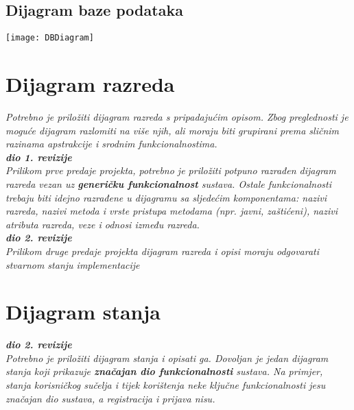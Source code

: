 			
			\subsection{Dijagram baze podataka}
				\texttt{[image: DBDiagram]}
			
			\eject
			
			
		\section{Dijagram razreda}
		
			\textit{Potrebno je priložiti dijagram razreda s pripadajućim opisom. Zbog preglednosti je moguće dijagram razlomiti na više njih, ali moraju biti grupirani prema sličnim razinama apstrakcije i srodnim funkcionalnostima.}\\
			
			\textbf{\textit{dio 1. revizije}}\\
			
			\textit{Prilikom prve predaje projekta, potrebno je priložiti potpuno razrađen dijagram razreda vezan uz \textbf{generičku funkcionalnost} sustava. Ostale funkcionalnosti trebaju biti idejno razrađene u dijagramu sa sljedećim komponentama: nazivi razreda, nazivi metoda i vrste pristupa metodama (npr. javni, zaštićeni), nazivi atributa razreda, veze i odnosi između razreda.}\\
			
			\textbf{\textit{dio 2. revizije}}\\			
			
			\textit{Prilikom druge predaje projekta dijagram razreda i opisi moraju odgovarati stvarnom stanju implementacije}
			
			
			
			\eject
		
		\section{Dijagram stanja}
			
			
			\textbf{\textit{dio 2. revizije}}\\
			
			\textit{Potrebno je priložiti dijagram stanja i opisati ga. Dovoljan je jedan dijagram stanja koji prikazuje \textbf{značajan dio funkcionalnosti} sustava. Na primjer, stanja korisničkog sučelja i tijek korištenja neke ključne funkcionalnosti jesu značajan dio sustava, a registracija i prijava nisu. }
			
			
			\eject 
		
